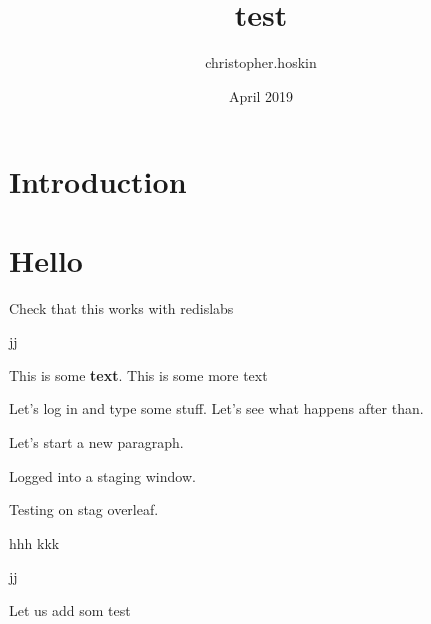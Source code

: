 \documentclass{article}
\title{test}
\author{christopher.hoskin }
\date{April 2019}
\begin{document}
\maketitle

\section{Introduction}


\section{Hello}

Check that this works with redislabs

jj

This is some \textbf{text}. This is some more text

Let's log in and type some stuff. Let's see what happens after than.

Let's start a new paragraph.

Logged into a staging window.

Testing on stag overleaf.

hhh
kkk

jj

Let us add som test
\end{document}
